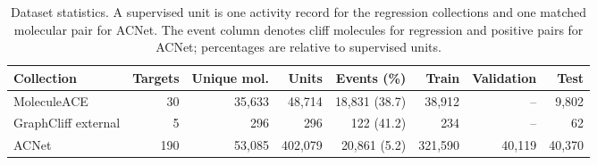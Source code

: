 \begin{table}[t]
\centering
\caption{Dataset statistics. A supervised unit is one activity record for the regression collections and one matched molecular pair for ACNet. The event column denotes cliff molecules for regression and positive pairs for ACNet; percentages are relative to supervised units.}
\label{tab:datasets}
\small
\begin{tabular}{lrrrrrrr}
\toprule
Collection & Targets & Unique mol. & Units & Events (\%) & Train & Validation & Test\\
\midrule
MoleculeACE & 30 & 35,633 & 48,714 & 18,831 (38.7) & 38,912 & -- & 9,802\\
GraphCliff external & 5 & 296 & 296 & 122 (41.2) & 234 & -- & 62\\
ACNet & 190 & 53,085 & 402,079 & 20,861 (5.2) & 321,590 & 40,119 & 40,370\\
\bottomrule
\end{tabular}
\end{table}
